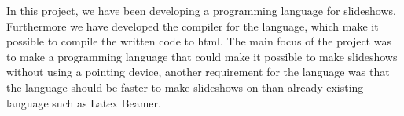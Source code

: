 In this project, we have been developing a programming language for slideshows. Furthermore we have developed the compiler for the language, which make it possible to compile the written code to html. The main focus of the project was to make a programming language that could make it possible to make slideshows without using a pointing device, another requirement for the language was that the language should be faster to make slideshows on than already existing language such as Latex Beamer.  